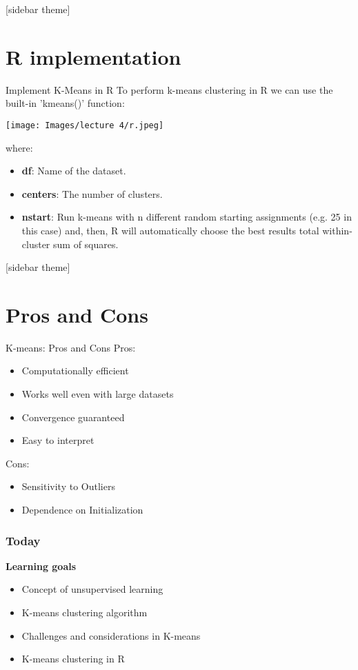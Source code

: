 \documentclass[xcolor=dvipsnames, 9pt]{beamer} %
\begin{document}
[sidebar theme]
\section{R implementation}

\begin{frame}{Implement K-Means in R}
To perform k-means clustering in R we can use the built-in 'kmeans()' function:

\begin{center}
\texttt{[image: Images/lecture 4/r.jpeg]} 
\end{center}

where:
\begin{itemize}
    \item \textbf{df}: Name of the dataset.
    \item \textbf{centers}: The number of clusters.
    \item \textbf{nstart}: Run k-means with n different random starting assignments (e.g. 25 in this case) and, then, R will automatically choose the best results total within-cluster sum of squares.
\end{itemize}


    
\end{frame}

[sidebar theme]
\section{Pros and Cons}

\begin{frame}{K-means: Pros and Cons}
Pros:
\begin{itemize}
    \item Computationally efficient
    \item Works well even with large datasets
    \item Convergence guaranteed
    \item Easy to interpret
\end{itemize}
Cons:
\begin{itemize}
    \item Sensitivity to Outliers
    \item Dependence on Initialization
\end{itemize}
    
\end{frame}

\begin{frame}
\frametitle{Today}
\textbf{Learning goals}

\begin{itemize}
\item Concept of unsupervised learning
\item K-means clustering algorithm
\item Challenges and considerations in K-means
\item K-means clustering in R
\end{itemize}

\end{frame}
\end{document}
